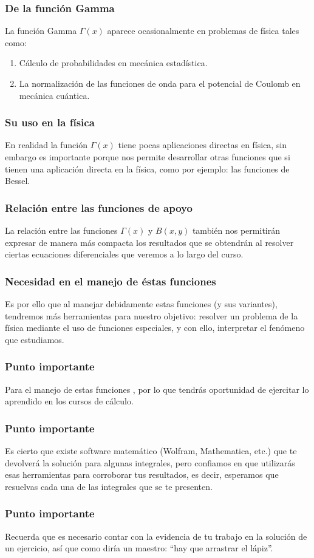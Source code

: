 \documentclass[12pt]{beamer}
\begin{document}
\begin{frame}
\frametitle{De la función Gamma}
La función Gamma $\Gamma (x)$ aparece ocasionalmente en problemas de física tales como:
\pause
{}
\begin{enumerate}[<+->]
\item Cálculo de probabilidades en mecánica estadística.
\item La normalización de las funciones de onda para el potencial de Coulomb en mecánica cuántica.
\end{enumerate}
\end{frame}
\begin{frame}
\frametitle{Su uso en la física}
En realidad la función $\Gamma (x)$ tiene pocas aplicaciones directas en física, \pause sin embargo es importante porque nos permite desarrollar otras funciones que si tienen una aplicación directa en la física, como por ejemplo: las funciones de Bessel.
\end{frame}
\begin{frame}
\frametitle{Relación entre las funciones de apoyo}
La relación entre las funciones $\Gamma (x)$ y $B (x, y)$ también nos permitirán expresar de manera más compacta los resultados que se obtendrán al resolver ciertas ecuaciones diferenciales que veremos a lo largo del curso.
\end{frame}
\begin{frame}
\frametitle{Necesidad en el manejo de éstas funciones}
Es por ello que al manejar debidamente estas funciones (y sus variantes), tendremos más herramientas para nuestro objetivo: \pause resolver un problema de la física mediante el uso de funciones especiales, y con ello, interpretar el fenómeno que estudiamos.
\end{frame}
\begin{frame}
\frametitle{Punto importante}
Para el manejo de estas funciones , por lo que tendrás oportunidad de ejercitar lo aprendido en los cursos de cálculo.
\end{frame}
\begin{frame}
\frametitle{Punto importante}
Es cierto que existe software matemático (Wolfram, Mathematica, etc.) que te devolverá la solución para algunas integrales, pero confiamos en que utilizarás esas herramientas para corroborar tus resultados, es decir, \pause esperamos que resuelvas  cada una de las integrales que se te presenten.
\end{frame}
\begin{frame}
\frametitle{Punto importante}
Recuerda que es necesario contar con la evidencia de tu trabajo en la solución de un ejercicio, así que como diría un maestro: \enquote{hay que arrastrar el lápiz}.
\end{frame}
\end{document}
